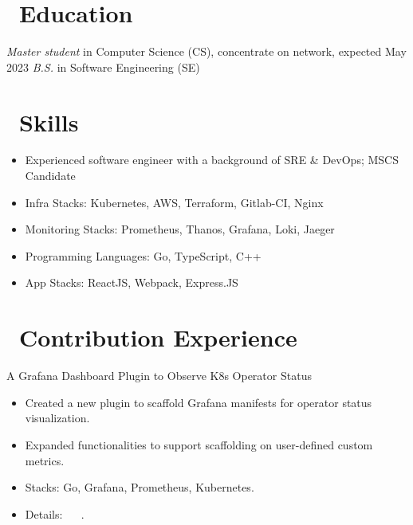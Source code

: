 \documentclass{resume}
\begin{document}



\section{\faGraduationCap\ Education}
\textit{Master student} in Computer Science (CS), concentrate on network, expected May 2023
\textit{B.S.} in Software Engineering (SE)

\section{\faCogs\ Skills}
\begin{itemize}[parsep=0.5ex]
  \item Experienced software engineer with a background of SRE \& DevOps; MSCS Candidate
  \item Infra Stacks: Kubernetes, AWS, Terraform, Gitlab-CI, Nginx
  \item Monitoring Stacks: Prometheus, Thanos, Grafana, Loki, Jaeger
  \item Programming Languages: Go, TypeScript, C++
  \item App Stacks: ReactJS, Webpack, Express.JS
\end{itemize}

\section{\faUsers\ Contribution Experience}
A Grafana Dashboard Plugin to Observe K8s Operator Status
\begin{itemize}
  \item Created a new plugin to scaffold Grafana manifests for operator status visualization.
  \item Expanded functionalities to support scaffolding on user-defined custom metrics.
  \item Stacks: Go, Grafana, Prometheus, Kubernetes.
  \item Details:
     \textperiodcentered\
     \textperiodcentered\
    .
\end{itemize}
\end{document}
